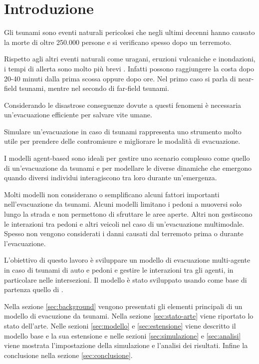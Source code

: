 \section{Introduzione}
Gli tsunami sono eventi naturali pericolosi che negli ultimi decenni 
hanno causato la morte di oltre 250.000 persone e si verificano spesso 
dopo un terremoto.

Rispetto agli altri eventi naturali come uragani, eruzioni vulcaniche e inondazioni, 
i tempi di allerta sono molto più brevi \parencite{katada2006integrated}.
%
Infatti possono raggiungere la costa dopo 20-40 minuti dalla prima scossa oppure dopo ore.
Nel primo caso si parla di near-field tsunami, mentre nel secondo di far-field tsunami. 

Considerando le disastrose conseguenze dovute a questi fenomeni è necessaria un'evacuazione efficiente per salvare vite umane. 

Simulare un'evacuazione in caso di tsunami rappresenta uno strumento molto utile per 
prendere delle contromisure e migliorare le modalità di evacuazione.

I modelli agent-based sono ideali per gestire uno scenario complesso come quello di un'evacuazione da tsunami e
per modellare le diverse dinamiche che emergono quando diversi individui interagiscono tra loro durante un'emergenza. 

Molti modelli non considerano o semplificano alcuni fattori importanti nell'evacuazione da tsunami.
Alcuni modelli limitano i pedoni a muoversi solo lungo la strada e non permettono di sfruttare le aree aperte. 
Altri non gestiscono le interazioni tra pedoni e altri veicoli nel caso di un'evacuazione multimodale.
%
Spesso non vengono considerati i danni causati dal terremoto prima o durante l'evacuazione.

L'obiettivo di questo lavoro è sviluppare un modello di evacuazione multi-agente in caso di tsunami
di auto e pedoni e gestire le interazioni tra gli agenti, 
in particolare nelle intersezioni.
%
Il modello è stato sviluppato usando come base di partenza quello di \textcite{mostafizi2019agent}.

Nella sezione \ref{sec:background} vengono presentati gli elementi principali di un modello di evacuzione da tsunami.
Nella sezione \ref{sec:stato-arte} viene riportato lo stato dell'arte.
%
Nelle sezioni \ref{sec:modello} e \ref{sec:estensione} viene descritto il modello base e la sua estensione e 
nelle sezioni \ref{sec:simulazione} e \ref{sec:analisi} viene mostrata l'impostazione della simulazione e 
l'analisi dei risultati.
%
Infine la conclusione nella sezione \ref{sec:conclusione}.
